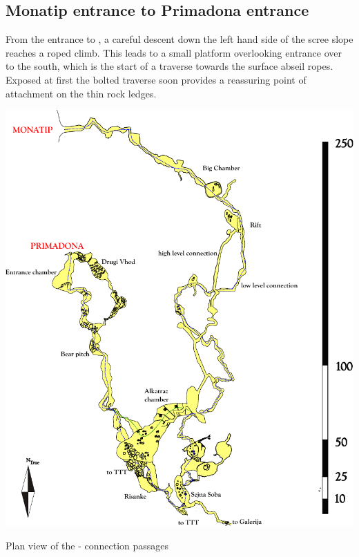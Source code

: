 \subsection{Monatip entrance to Primadona entrance}
From the entrance to , a careful descent down the left hand side of the scree slope reaches a roped climb. This leads to a small platform overlooking  entrance over to the south, which is the start of a traverse towards the surface abseil ropes. Exposed at first  the bolted traverse soon provides a reassuring point of attachment on the thin rock ledges.


\begin{pagesurvey}
\centering
\includegraphics[height=\textheight]{images/pdf_maps/prima-mona-trip.pdf}
\caption[Primadona-Monatip connection passages]{Plan view of the \protect{}-\protect{} connection passages}
\label{prima mona trip}
\end{pagesurvey}
